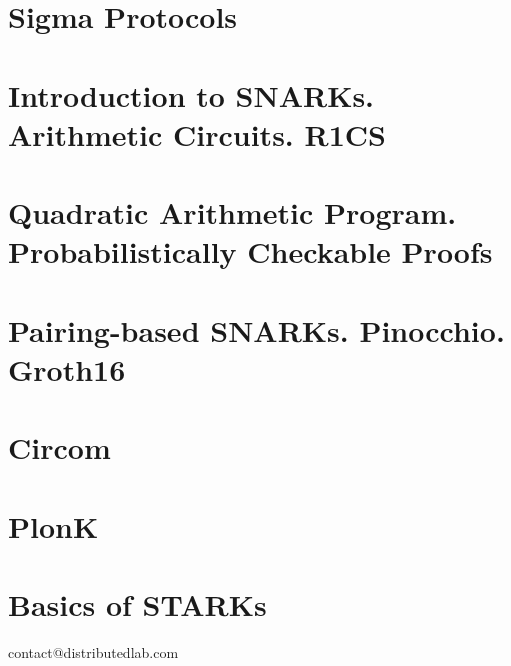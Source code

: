 \documentclass{zkdl-template}
\begin{document}
    \section{Sigma Protocols}\label{section:sigma}
    

    \section[Arithmetic Circuits. R1CS]{Introduction to SNARKs. Arithmetic Circuits. R1CS} \label{section:r1cs}
    \label{section:circuits}

    \section[Quadratic Arithmetic Program]{Quadratic Arithmetic Program. Probabilistically Checkable Proofs}\label{section:qap-pcp}
    

    \section[Pairing-based SNARKs]{Pairing-based SNARKs. Pinocchio. Groth16}\label{section:groth}
    

    \section{Circom}\label{section:circom}
    

    \section{PlonK}\label{section:plonk}
    

    \section{Basics of STARKs}\label{section:stark}
    


     
    


    \newpage
    \pagestyle{empty}

    \ifodd\value{page}
        \newpage
    \fi

    \vspace*{\fill}

    \begin{center}
        contact@distributedlab.com
    \end{center}

    \vspace*{\fill}
\end{document}
